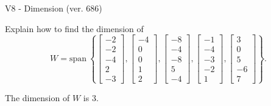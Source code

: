 \begin{exercise}
  \begin{exerciseTitle}V8 - Dimension (ver. 686)\end{exerciseTitle}
  \begin{exerciseStatement}
    Explain how to find the dimension of 
\[W=\mathrm{span}\ \left\{\left[\begin{array}{r}
-2 \\
-2 \\
-4 \\
2 \\
-3
\end{array}\right] , \left[\begin{array}{r}
-4 \\
0 \\
0 \\
1 \\
2
\end{array}\right] , \left[\begin{array}{r}
-8 \\
-4 \\
-8 \\
5 \\
-4
\end{array}\right] , \left[\begin{array}{r}
-1 \\
-4 \\
-3 \\
-2 \\
1
\end{array}\right] , \left[\begin{array}{r}
3 \\
0 \\
5 \\
-6 \\
7
\end{array}\right]\right\}.\]



  \end{exerciseStatement}
  \begin{exerciseAnswer}
   The dimension of \(W\) is  \(3\).
  


  \end{exerciseAnswer}
\end{exercise}